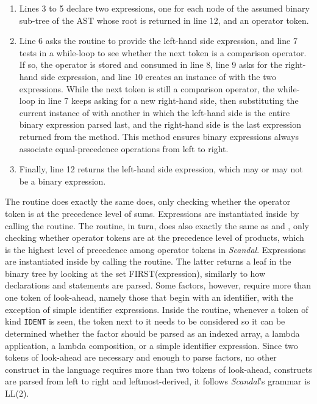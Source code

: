 \begin{enumerate}
	\addtocounter{enumi}{2}
	\item Lines 3 to 5 declare two expressions, one for each node of the assumed binary sub-tree of the AST whose root is returned in line 12, and an operator token.
	\addtocounter{enumi}{2}
	\item Line 6 asks the  routine to provide the left-hand side expression, and line 7 tests in a while-loop to see whether the next token is a comparison operator. If so, the operator is stored and consumed in line 8, line 9 asks  for the right-hand side expression, and line 10 creates an instance of  with the two expressions. While the next token is still a comparison operator, the while-loop in line 7 keeps asking  for a new right-hand side, then substituting the current instance of  with another in which the left-hand side is the entire binary expression parsed last, and the right-hand side is the last expression returned from the  method. This method ensures binary expressions always associate equal-precedence operations from left to right.
	\addtocounter{enumi}{5}
	\item Finally, line 12 returns the left-hand side expression, which may or may not be a binary expression.
\end{enumerate}

The  routine does exactly the same  does, only checking whether the operator token is at the precedence level of sums. Expressions are instantiated inside  by calling the  routine. The  routine, in turn, does also exactly the same as  and , only checking whether operator tokens are at the precedence level of products, which is the highest level of precedence among operator tokens in \emph{Scandal}. Expressions are instantiated inside  by calling the  routine. The latter returns a leaf in the binary tree by looking at the set FIRST(expression), similarly to how declarations and statements are parsed. Some factors, however, require more than one token of look-ahead, namely those that begin with an identifier, with the exception of simple identifier expressions. Inside the  routine, whenever a token of kind \texttt{IDENT} is seen, the token next to it needs to be considered so it can be determined whether the factor should be parsed as an indexed array, a lambda application, a lambda composition, or a simple identifier expression. Since two tokens of look-ahead are necessary and enough to parse factors, no other construct in the language requires more than two tokens of look-ahead, constructs are parsed from left to right and leftmost-derived, it follows \emph{Scandal}'s grammar is LL(2).

